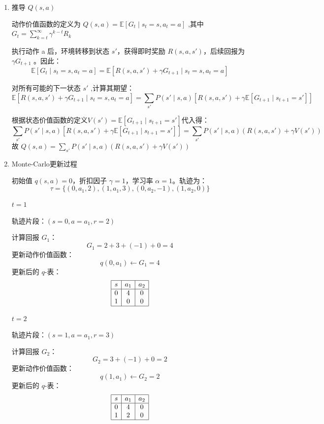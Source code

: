 \documentclass{article}
\begin{document}
\begin{enumerate}[label=(\alph*), start=1]

    \item 推导 $Q(s,a)$
    
    动作价值函数的定义为 $Q(s,a) = \mathbb{E} \left[ G_t \mid s_t = s, a_t = a \right]$ ,其中 $G_t = \sum_{k=t}^{\infty} \gamma^{k-t} R_k$
    
    执行动作 a 后，环境转移到状态 $s'$，获得即时奖励 $R(s,a,s')$，后续回报为 $\gamma G_{t+1}$ 。因此：
    $$\mathbb{E} \left[ G_t \mid s_t = s, a_t = a \right] = \mathbb{E} \left[ R(s,a,s') + \gamma G_{t+1} \mid s_t = s, a_t = a \right]$$
    
    对所有可能的下一状态 $s'$ ,计算其期望：
    $$\mathbb{E} \left[ R(s,a,s') + \gamma G_{t+1} \mid s_t = s, a_t = a \right] = \sum_{s'} P(s' \mid s,a) \left[ R(s,a,s') + \gamma \mathbb{E} \left[ G_{t+1} \mid s_{t+1} = s' \right] \right]$$
    
    根据状态价值函数的定义$ V(s') = \mathbb{E} \left[ G_{t+1} \mid s_{t+1} = s' \right]$代入得：
    $$\sum_{s'} P(s' \mid s,a) \left[ R(s,a,s') + \gamma \mathbb{E} \left[ G_{t+1} \mid s_{t+1} = s' \right] \right] = \sum_{s'} P(s' \mid s,a) \left( R(s,a,s') + \gamma V(s') \right)$$
    故 $Q(s,a) = \sum_{s'} P(s' \mid s,a) \left( R(s,a,s') + \gamma V(s') \right)$
    
    \item Monte-Carlo更新过程
    
    初始值 \( q(s, a) = 0 \)，折扣因子 \( \gamma = 1 \)，学习率 \( \alpha = 1 \)。轨迹为：
    \[
    \tau = \{(0, a_1, 2), (1, a_1, 3), (0, a_2, -1), (1, a_2, 0)\}
    \]
    
    \( t = 1 \)
    
    轨迹片段：\( (s=0, a=a_1, r=2) \)  
    
    计算回报 \( G_1 \)：
    \[
    G_1 = 2 + 3 + (-1) + 0 = 4
    \]
    更新动作价值函数：
    \[
    q(0, a_1) \leftarrow G_1 = 4
    \]
    更新后的 \( q \)-表：
    \[
    \begin{array}{|c|c|c|}
    	\hline
    	s & a_1 & a_2 \\
    	\hline
    	0 & 4 & 0 \\
    	1 & 0 & 0 \\
    	\hline
    \end{array}
    \]
    
    \( t = 2 \)
    
    轨迹片段：\( (s=1, a=a_1, r=3) \)  
    
    计算回报 \( G_2 \)：
    \[
    G_2 = 3 + (-1) + 0 = 2
    \]
    更新动作价值函数：
    \[
    q(1, a_1) \leftarrow G_2 = 2
    \]
    更新后的 \( q \)-表：
    \[
    \begin{array}{|c|c|c|}
    	\hline
    	s & a_1 & a_2 \\
    	\hline
    	0 & 4 & 0 \\
    	1 & 2 & 0 \\
    	\hline
    \end{array}
    \]
    

\end{enumerate}
\end{document}
